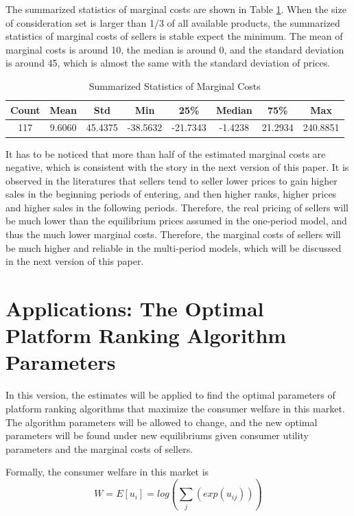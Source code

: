 \documentclass{article}
\begin{document}
The summarized statistics of marginal costs are shown in Table \ref{mcstats}. When the size of consideration set is larger than 1/3 of all available products, the summarized statistics of marginal costs of sellers is stable expect the minimum. The mean of marginal costs is around 10, the median is around 0, and the standard deviation is around 45, which is almost the same with the standard deviation of prices. 

\begin{table}[H]
\centering
\begin{tabular}{|c|c|c|c|c|c|c|c|}
\hline
\textbf{Count} & \textbf{Mean} & \textbf{Std} & \textbf{Min} & \textbf{25\%} & \textbf{Median} & \textbf{75\%} &\textbf{Max} \\
\hline
117 & 9.6060 & 45.4375 & -38.5632 & -21.7343 & -1.4238 & 21.2934 & 240.8851 \\
\hline 
\end{tabular}
\caption{\label{mcstats}Summarized Statistics of Marginal Costs}
\end{table}

It has to be noticed that more than half of the estimated marginal costs are negative, which is consistent with the story in the next version of this paper. It is observed in the literatures that sellers tend to seller lower prices to gain higher sales in the beginning periods of entering, and then higher ranks, higher prices and higher sales in the following periods. Therefore, the real pricing of sellers will be much lower than the equilibrium prices assumed in the one-period model, and thus the much lower marginal costs. Therefore, the marginal costs of sellers will be much higher and reliable in the multi-period models, which will be discussed in the next version of this paper. 


\section{Applications: The Optimal Platform Ranking Algorithm Parameters}

In this version, the estimates will be applied to find the optimal parameters of platform ranking algorithms that maximize the consumer welfare in this market. The algorithm parameters will be allowed to change, and the new optimal parameters will be found under new equilibriums given consumer utility parameters and the marginal costs of sellers. 

Formally, the consumer welfare in this market is 
$$
W = E[u_i] = log(\sum\limits_{j}(exp(u_{ij}))) 
$$
\end{document}
